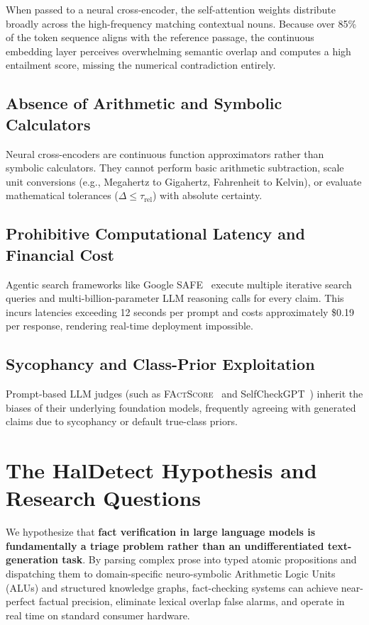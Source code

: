 When passed to a neural cross-encoder, the self-attention weights distribute broadly across the high-frequency matching contextual nouns. Because over 85\% of the token sequence aligns with the reference passage, the continuous embedding layer perceives overwhelming semantic overlap and computes a high entailment score, missing the numerical contradiction entirely.

\subsection{Absence of Arithmetic and Symbolic Calculators}
Neural cross-encoders are continuous function approximators rather than symbolic calculators. They cannot perform basic arithmetic subtraction, scale unit conversions (e.g., Megahertz to Gigahertz, Fahrenheit to Kelvin), or evaluate mathematical tolerances ($\Delta \le \tau_{\text{rel}}$) with absolute certainty.

\subsection{Prohibitive Computational Latency and Financial Cost}
Agentic search frameworks like Google SAFE~\cite{wei2024safe} execute multiple iterative search queries and multi-billion-parameter LLM reasoning calls for every claim. This incurs latencies exceeding 12 seconds per prompt and costs approximately \$0.19 per response, rendering real-time deployment impossible.

\subsection{Sycophancy and Class-Prior Exploitation}
Prompt-based LLM judges (such as \textsc{FActScore}~\cite{min2023factscore} and SelfCheckGPT~\cite{manakul2023selfcheckgpt}) inherit the biases of their underlying foundation models, frequently agreeing with generated claims due to sycophancy or default true-class priors.

\section{The HalDetect Hypothesis and Research Questions}
\label{sec:hypothesis_rqs}

We hypothesize that \textbf{fact verification in large language models is fundamentally a triage problem rather than an undifferentiated text-generation task}. By parsing complex prose into typed atomic propositions and dispatching them to domain-specific neuro-symbolic Arithmetic Logic Units (ALUs) and structured knowledge graphs, fact-checking systems can achieve near-perfect factual precision, eliminate lexical overlap false alarms, and operate in real time on standard consumer hardware.

